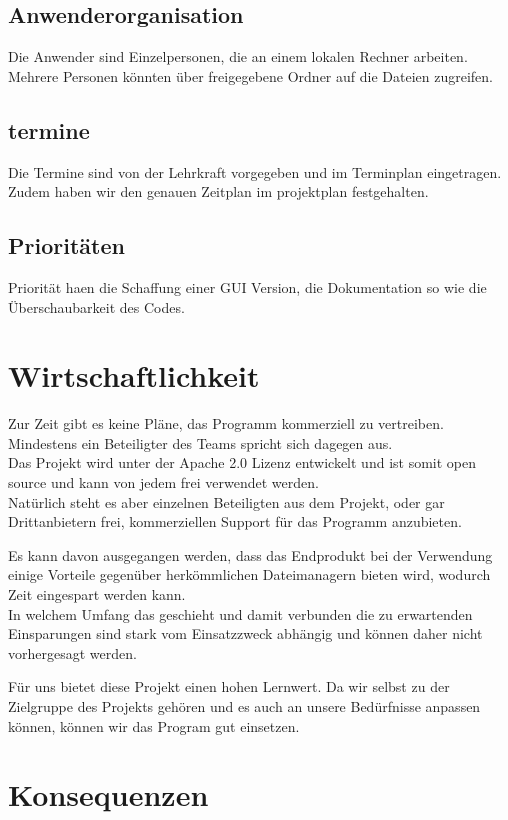 \documentclass[10pt,paper=a4,final]{scrartcl}
\begin{document}
\subsection{Anwenderorganisation}
Die Anwender sind Einzelpersonen, die an einem lokalen Rechner arbeiten. Mehrere Personen könnten über freigegebene Ordner auf die Dateien zugreifen.
\subsection{termine}
Die Termine sind von der Lehrkraft vorgegeben und im Terminplan \cite{terminliste} eingetragen.\\
Zudem haben wir den genauen Zeitplan im projektplan \cite{projektplan} festgehalten.
\subsection{Prioritäten}
Priorit\"at haen die Schaffung einer GUI Version, die Dokumentation so wie die Überschaubarkeit des Codes.
\section{Wirtschaftlichkeit}
Zur Zeit gibt es keine Pl\"ane, das Programm kommerziell zu vertreiben. Mindestens ein Beteiligter des Teams spricht sich dagegen aus.\\
Das Projekt wird unter der Apache 2.0 Lizenz entwickelt und ist somit open source und kann von jedem frei verwendet werden.\\
Nat\"urlich steht es aber einzelnen Beteiligten aus dem Projekt, oder gar Drittanbietern frei, kommerziellen Support f\"ur das Programm anzubieten.

Es kann davon ausgegangen werden, dass das Endprodukt bei der Verwendung einige Vorteile gegen\"uber herk\"ommlichen Dateimanagern bieten wird, wodurch Zeit eingespart werden kann.\\
In welchem Umfang das geschieht und damit verbunden die zu erwartenden Einsparungen sind stark vom Einsatzzweck abh\"angig und k\"onnen daher nicht vorhergesagt werden.

Für uns bietet diese Projekt einen hohen Lernwert. Da wir selbst zu der Zielgruppe des Projekts geh\"oren und es auch an unsere Bed\"urfnisse anpassen k\"onnen, k\"onnen wir das Program gut einsetzen.

\section{Konsequenzen}
\end{document}
